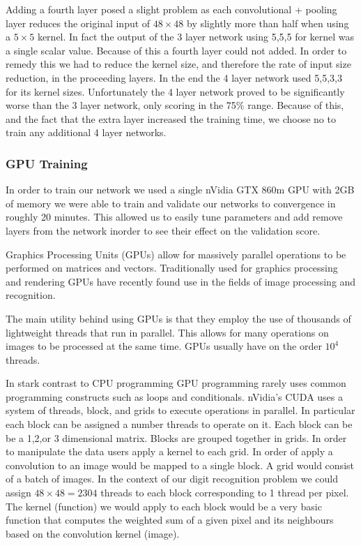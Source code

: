 \documentclass[10pt,twocolumn]{article}
\begin{document}
Adding a fourth layer posed a slight problem as each convolutional + pooling layer reduces the original input of $48 \times 48$ by slightly more than half when using a $5 \times 5$ kernel. In fact the output of the 3 layer network using 5,5,5 for kernel was a single scalar value. Because of this a fourth layer could not added. In order to remedy this we had to reduce the kernel size, and therefore the rate of input size reduction, in the proceeding layers. In the end the 4 layer network used 5,5,3,3 for its kernel sizes. Unfortunately the 4 layer network proved to be significantly worse than the 3 layer network, only scoring in the 75\% range. Because of this, and the fact that the extra layer increased the training time, we choose no to train any additional 4 layer networks.
 
\subsubsection{GPU Training}
In order to train our network we used a single nVidia GTX 860m GPU with 2GB of memory we were able to train and validate our networks to convergence in roughly 20 minutes. This allowed us to easily tune parameters and add remove layers from the network inorder to see their effect on the validation score.

Graphics Processing Units (GPUs) allow for massively parallel operations to be performed on matrices and vectors. Traditionally used for graphics processing and rendering GPUs have recently found use in the fields of image processing and recognition. 

The main utility behind using GPUs is that they employ the use of thousands of lightweight threads that run in parallel. This allows for many operations on images to be processed at the same time. GPUs usually have on the order $10^4$ threads.

In stark contrast to CPU programming GPU programming rarely uses common programming constructs such as loops and conditionals. nVidia\textsuperscript{\textregistered}'s CUDA uses a system of threads, block, and grids to execute operations in parallel. In particular each block can be assigned a number threads to operate on it. Each block can be be a 1,2,or 3 dimensional matrix. Blocks are grouped together in grids. In order to manipulate the data  users apply a kernel to each grid. In order of apply a convolution to an image would be mapped to a single block. A grid would consist of a batch of images. In the context of our digit recognition problem we could assign $48 \times 48 = 2304$ threads to each block corresponding to 1 thread per pixel. The kernel (function) we would apply to each block would be a very basic function that computes the weighted sum of a given pixel and its neighbours based on the convolution kernel (image).
\end{document}
